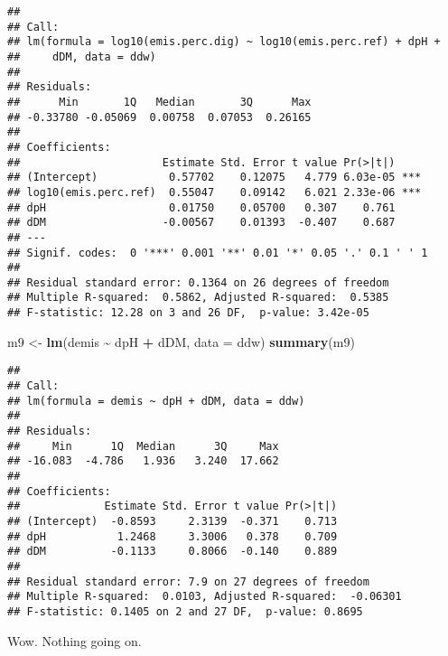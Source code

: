 \documentclass[
]{article}
\newenvironment{Shaded}{\begin{snugshade}}{\end{snugshade}}
\newcommand{\AttributeTok}[1]{\textcolor[rgb]{0.13,0.29,0.53}{#1}}
\newcommand{\DecValTok}[1]{\textcolor[rgb]{0.00,0.00,0.81}{#1}}
\newcommand{\FunctionTok}[1]{\textcolor[rgb]{0.13,0.29,0.53}{\textbf{#1}}}
\newcommand{\NormalTok}[1]{#1}
\newcommand{\OtherTok}[1]{\textcolor[rgb]{0.56,0.35,0.01}{#1}}
\newcommand{\SpecialCharTok}[1]{\textcolor[rgb]{0.81,0.36,0.00}{\textbf{#1}}}
\begin{document}
\begin{verbatim}
## 
## Call:
## lm(formula = log10(emis.perc.dig) ~ log10(emis.perc.ref) + dpH + 
##     dDM, data = ddw)
## 
## Residuals:
##      Min       1Q   Median       3Q      Max 
## -0.33780 -0.05069  0.00758  0.07053  0.26165 
## 
## Coefficients:
##                      Estimate Std. Error t value Pr(>|t|)    
## (Intercept)           0.57702    0.12075   4.779 6.03e-05 ***
## log10(emis.perc.ref)  0.55047    0.09142   6.021 2.33e-06 ***
## dpH                   0.01750    0.05700   0.307    0.761    
## dDM                  -0.00567    0.01393  -0.407    0.687    
## ---
## Signif. codes:  0 '***' 0.001 '**' 0.01 '*' 0.05 '.' 0.1 ' ' 1
## 
## Residual standard error: 0.1364 on 26 degrees of freedom
## Multiple R-squared:  0.5862, Adjusted R-squared:  0.5385 
## F-statistic: 12.28 on 3 and 26 DF,  p-value: 3.42e-05
\end{verbatim}

\begin{Shaded}
\begin{Highlighting}[]
\NormalTok{m9 }\OtherTok{\textless{}{-}} \FunctionTok{lm}\NormalTok{(demis }\SpecialCharTok{\textasciitilde{}}\NormalTok{ dpH }\SpecialCharTok{+}\NormalTok{ dDM, }\AttributeTok{data =}\NormalTok{ ddw)}
\FunctionTok{summary}\NormalTok{(m9)}
\end{Highlighting}
\end{Shaded}

\begin{verbatim}
## 
## Call:
## lm(formula = demis ~ dpH + dDM, data = ddw)
## 
## Residuals:
##     Min      1Q  Median      3Q     Max 
## -16.083  -4.786   1.936   3.240  17.662 
## 
## Coefficients:
##             Estimate Std. Error t value Pr(>|t|)
## (Intercept)  -0.8593     2.3139  -0.371    0.713
## dpH           1.2468     3.3006   0.378    0.709
## dDM          -0.1133     0.8066  -0.140    0.889
## 
## Residual standard error: 7.9 on 27 degrees of freedom
## Multiple R-squared:  0.0103, Adjusted R-squared:  -0.06301 
## F-statistic: 0.1405 on 2 and 27 DF,  p-value: 0.8695
\end{verbatim}

Wow. Nothing going on.

\begin{Shaded}
\end{Shaded}
\end{document}
